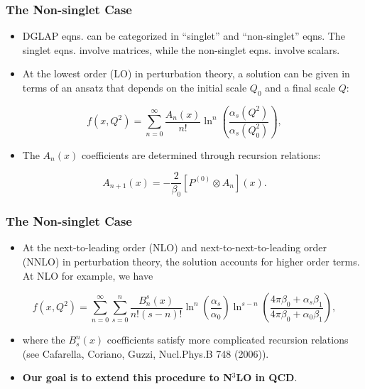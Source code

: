 \documentclass{beamer}
\begin{document}
\begin{frame}
  \frametitle{The Non-singlet Case}

  \begin{itemize}
  \item DGLAP eqns. can be categorized in ``singlet'' and ``non-singlet'' eqns. The singlet eqns. involve matrices, while the non-singlet eqns. involve scalars.
  \item At the lowest order (LO) in perturbation theory, a solution can be given in terms of an ansatz that depends on the initial scale $Q_0$ and a final scale $Q$:
  \end{itemize}

  \begin{equation}
    f(x, Q^2) = \sum_{n=0}^{\infty} \frac{A_n(x)}{n!} \ln^n\left( \frac{\alpha_s(Q^2)}{\alpha_s(Q_0^2)} \right),
  \end{equation}

  \begin{itemize}
  \item The $A_n(x)$ coefficients are determined through recursion relations:
  \end{itemize}

  \begin{equation}
    A_{n+1}(x) = - \frac{2}{\beta_0}[P^{(0)} \otimes A_n] (x).
  \end{equation}
\end{frame}


\begin{frame}
  \frametitle{The Non-singlet Case}

  \begin{itemize}
  \item At the next-to-leading order (NLO) and next-to-next-to-leading order (NNLO) in perturbation theory, the solution accounts for higher order terms. At NLO for example, we have 
  \end{itemize}

  \begin{equation}
    f(x, Q^2) = \sum_{n=0}^{\infty}\sum_{s=0}^n \frac{B_n^s(x)}{n!(s-n)!} \ln^n \left( \frac{\alpha_s}{\alpha_0} \right) \ln^{s-n}\left( \frac{4\pi\beta_0 + \alpha_s\beta_1}{4\pi\beta_0 + \alpha_0\beta_1} \right),
  \end{equation}

  \begin{itemize}
  \item where the $B_s^n(x)$ coefficients satisfy more complicated recursion relations (see Cafarella, Coriano, Guzzi, Nucl.Phys.B 748 (2006)).
  \item {\bf Our goal is to extend this procedure to N$^3$LO in QCD}.  
  \end{itemize}
\end{frame}
\end{document}
